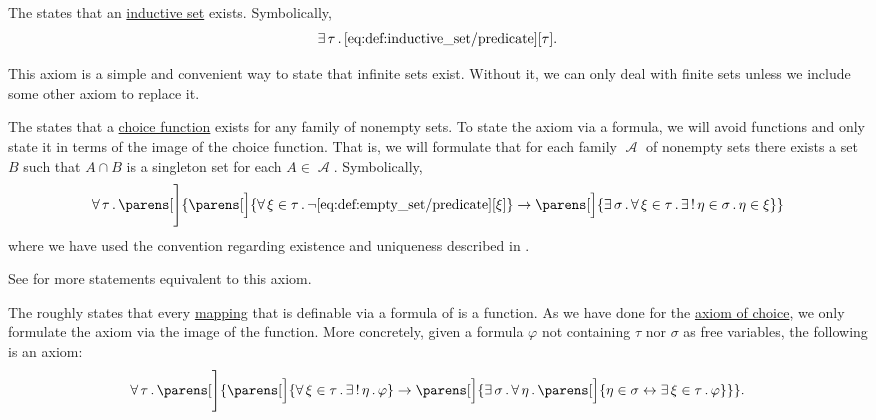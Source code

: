 \begin{definition}
\begin{thmenum}
     The  states that an \hyperref[def:inductive_set]{inductive set} exists. Symbolically,
    \begin{equation}\label{eq:def:zfc/infinity}
      \exists \thinspace \tau \thinspace . \thinspace \ref{eq:def:inductive_set/predicate}[\tau].
    \end{equation}

    This axiom is a simple and convenient way to state that infinite sets exist. Without it, we can only deal with finite sets unless we include some other axiom to replace it.

     The  states that a \hyperref[def:choice_function]{choice function} exists for any family of nonempty sets. To state the axiom via a formula, we will avoid functions and only state it in terms of the image of the choice function. That is, we will formulate that for each family \( \mscrA \) of nonempty sets there exists a set \( B \) such that \( A \cap B \) is a singleton set for each \( A \in \mscrA \). Symbolically,
    \begin{equation}\label{eq:def:zfc/choice}
      \qforall \tau \parens[\Bigg]
        {
          \parens[\Big]{ \qforall {\xi \in \tau} \neg \ref{eq:def:empty_set/predicate}[\xi] }
          \rightarrow
          \parens[\Big]{ \qexists \sigma \qforall {\xi \in \tau} \qExists {\eta \in \sigma} \eta \in \xi }
        }
    \end{equation}
    where we have used the convention regarding existence and uniqueness described in .

    See  for more statements equivalent to this axiom.

     The  roughly states that every \hyperref[rem:function_definition]{mapping} that is definable via a formula of  is a function. As we have done for the \hyperref[def:zfc/choice]{axiom of choice}, we only formulate the axiom via the image of the function. More concretely, given a formula \( \varphi \) not containing \( \tau \) nor \( \sigma \) as free variables, the following is an axiom:
    \begin{equation}\label{eq:def:zfc/replacement}
      \qforall \tau \parens[\Bigg]
        {
          \parens[\Big]{ \qforall {\xi \in \tau} \qExists \eta \varphi }
          \rightarrow
          \parens[\Big]{ \qexists \sigma \qforall \eta \parens[\Big]{ \eta \in \sigma \leftrightarrow \qexists {\xi \in \tau} \varphi } }
        }.
    \end{equation}


\end{thmenum}
\end{definition}

